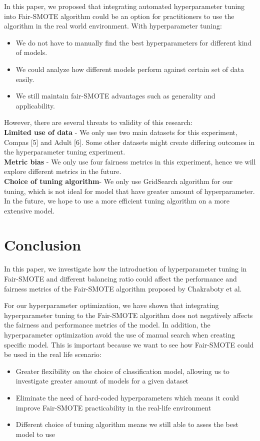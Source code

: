 \documentclass[sigconf]{acmart}
\begin{document}
In this paper, we proposed that integrating automated hyperparameter tuning into Fair-SMOTE algorithm could be an option for practitioners to use the algorithm in the real world environment. With hyperparameter tuning:
\begin{itemize}
    \item We do not have to manually find the best hyperparameters for different kind of models. 
    \item We could analyze how different models perform against certain set of data easily.
    \item We still maintain fair-SMOTE advantages such as generality and applicability.
\end{itemize}
However, there are several threats to validity of this research:\\
\textbf{Limited use of data} - We only use two main datasets for this experiment, Compas [5] and Adult [6]. Some other datasets might create differing outcomes in the hyperparameter tuning experiment.\\
\textbf{Metric bias} - We only use four fairness metrics in this experiment, hence we will explore different metrics in the future.\\
\textbf{Choice of tuning algorithm}- We only use GridSearch algorithm for our tuning, which is not ideal for model that have greater amount of hyperparameter. In the future, we hope to use a more efficient tuning algorithm on a more extensive model.\\

\section{Conclusion}
In this paper, we investigate how the introduction of hyperparameter tuning in Fair-SMOTE and different balancing ratio could affect the performance and fairness metrics of the Fair-SMOTE algorithm proposed by Chakraboty et al. 

For our hyperparameter optimization, we have shown that integrating hyperparameter tuning to the Fair-SMOTE algorithm does not negatively affects the fairness and performance metrics of the model. In addition, the hyperparameter optimization avoid the use of manual search when creating specific model. This is important because we want to see how Fair-SMOTE could be used in the real life scenario:
\begin{itemize}
    \item Greater flexibility on the choice of classification model, allowing us to investigate greater amount of models for a given dataset
    \item Eliminate the need of hard-coded hyperparameters which means it could improve Fair-SMOTE practicability in the real-life environment
    \item Different choice of tuning algorithm means we still able to asses the best model to use 
\end{itemize}
\end{document}
